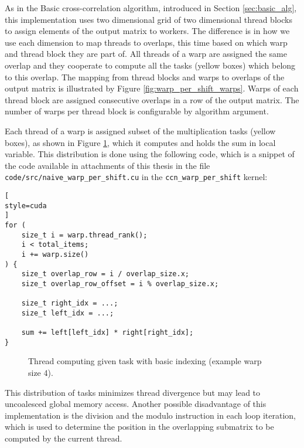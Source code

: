 As in the Basic cross-correlation algorithm, introduced in Section \ref{sec:basic_alg}, this implementation uses two dimensional grid of two dimensional thread blocks to assign elements of the output matrix to workers. The difference is in how we use each dimension to map threads to overlaps, this time based on which warp and thread block they are part of. All threads of a warp are assigned the same overlap and they cooperate to compute all the tasks (yellow boxes) which belong to this overlap. The mapping from thread blocks and warps to overlaps of the output matrix is illustrated by Figure \ref{fig:warp_per_shift_warps}. Warps of each thread block are assigned consecutive overlaps in a row of the output matrix. The number of warps per thread block is configurable by algorithm argument.

Each thread of a warp is assigned subset of the multiplication tasks (yellow boxes), as shown in Figure \ref{fig:warp_per_shift_normal_indexing}, which it computes and holds the sum in local variable. This distribution is done using the following code, which is a snippet of the code available in attachments of this thesis in the file \texttt{code/src/naive\_warp\_per\_shift.cu} in the \texttt{ccn\_warp\_per\_shift} kernel:

\begin{lstlisting}[
style=cuda
]
for (
	size_t i = warp.thread_rank(); 
	i < total_items; 
	i += warp.size()
) {
	size_t overlap_row = i / overlap_size.x;
	size_t overlap_row_offset = i % overlap_size.x;

	size_t right_idx = ...;
	size_t left_idx = ...;

	sum += left[left_idx] * right[right_idx];
}
\end{lstlisting}

\begin{figure}[ht]
	\centering
	\def\svgwidth{0.2\textwidth}
	\fontsize{8}{10}\selectfont
	
	\caption{Thread computing given task with basic indexing (example warp size 4).}
	\label{fig:warp_per_shift_normal_indexing}
\end{figure}

This distribution of tasks minimizes thread divergence but may lead to uncoalesced global memory access. Another possible disadvantage of this implementation is the division and the modulo instruction in each loop iteration, which is used to determine the position in the overlapping submatrix to be computed by the current thread.

